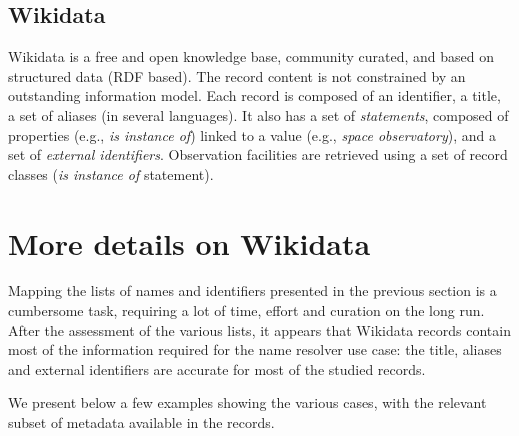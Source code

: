 \documentclass[11pt,a4paper]{ivoa}
\begin{document}
\subsection{Wikidata}
Wikidata is a free and open knowledge base, community curated, and 
based on structured data (RDF based). The record content is not 
constrained by an outstanding information model. Each record is 
composed of an identifier, a title, a set of aliases (in several 
languages). It also has a set of \emph{statements}, composed of properties
(e.g., \emph{is instance of}) linked to a value (e.g., \emph{space 
observatory}), and a set of \emph{external identifiers}. Observation 
facilities are retrieved using a set of record classes (\emph{is 
instance of} statement). 

\section{More details on Wikidata}
Mapping the lists of names and identifiers presented in the previous
section is a cumbersome task, requiring a lot of time, effort and 
curation on the long run. After the assessment of the various lists,
it appears that Wikidata records contain most of the information 
required for the name resolver use case: the title, aliases and 
external identifiers are accurate for most of the studied records. 

We present below a few examples showing the various cases, with the 
relevant subset of metadata available in the records.
\end{document}
